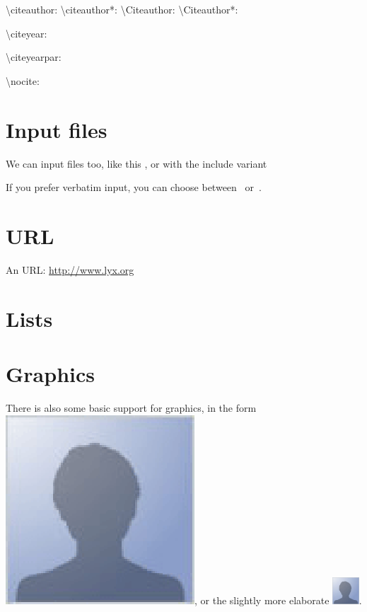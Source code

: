 \documentclass[a4paper,12pt]{article}
\begin{document}
\textbackslash{}citeauthor: \citeauthor[before][after]{article-crossref}
\textbackslash{}citeauthor{*}: \citeauthor*[before][after]{article-crossref}
\textbackslash{}Citeauthor: 
\textbackslash{}Citeauthor{*}: 

\textbackslash{}citeyear: \citeyear[before][after]{article-crossref}

\textbackslash{}citeyearpar: \citeyearpar[before][after]{article-crossref} 

\textbackslash{}nocite: \nocite{article-crossref}




\section{Input files}

We can input files too, like this , or with the include
variant 

If you prefer verbatim input, you can choose
between~ or~.

\section{URL}

An URL: \url{http://www.lyx.org}

\section{Lists}

\listoffigures
\listoftables

\section{Graphics}

There is also some basic support for graphics, in the form
\includegraphics{foo.eps}, or the slightly more elaborate
\includegraphics[bb=10bp 0bp 96bp 96bp,clip,height=1cm, width=1cm]{foo.eps}.
\end{document}
